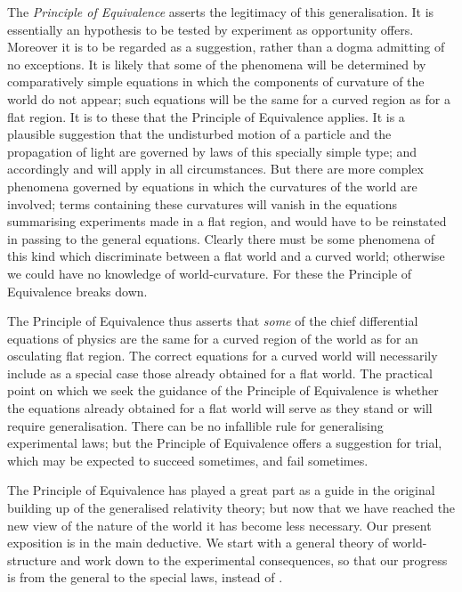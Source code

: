 \documentclass[12pt]{book}
\begin{document}
The \emph{Principle of Equivalence} asserts the legitimacy of this generalisation.
It is essentially an hypothesis to be tested by experiment as opportunity
offers. Moreover it is to be regarded as a suggestion, rather than a dogma
admitting of no exceptions. It is likely that some of the phenomena will be
determined by comparatively simple equations in which the components of
curvature of the world do not appear; such equations will be the same for
a curved region as for a flat region. It is to these that the Principle of
Equivalence applies. It is a plausible suggestion that the undisturbed motion
of a particle and the propagation of light are governed by laws of this specially
simple type; and accordingly  and  will apply in all circumstances.
But there are more complex phenomena governed by equations in which the
curvatures of the world are involved; terms containing these curvatures will
vanish in the equations summarising experiments made in a flat region, and
would have to be reinstated in passing to the general equations. Clearly
there must be some phenomena of this kind which discriminate between
a flat world and a curved world; otherwise we could have no knowledge of
world\hyp{}curvature. For these the Principle of Equivalence breaks down.
%
%

The Principle of Equivalence thus asserts that \emph{some} of the chief differential
equations of physics are the same for a curved region of the world as for an
osculating flat region\footnotemark.\footnotetext
  {The correct equations for a curved world will necessarily include as a special case those
  already obtained for a flat world. The practical point on which we seek the guidance of the
  Principle of Equivalence is whether the equations already obtained for a flat world will serve as
  they stand or will require generalisation.}
There can be no infallible rule for generalising
experimental laws; but the Principle of Equivalence offers a suggestion for
trial, which may be expected to succeed sometimes, and fail sometimes.

The Principle of Equivalence has played a great part as a guide in the
original building up of the generalised relativity theory; but now that we
have reached the new view of the nature of the world it has become less
necessary. Our present exposition is in the main deductive. We start with
a general theory of world\hyp{}structure and work down to the experimental
consequences, so that our progress is from the general to the special laws,
instead of .
\end{document}
